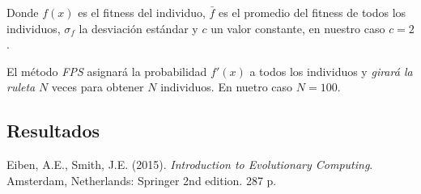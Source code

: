 \documentclass[10pt,letterpaper]{article}
\begin{document}
Donde $f(x)$ es el fitness del individuo, $\bar{f}$ es el promedio del fitness
de todos los individuos, $\sigma_f$ la desviación estándar y $c$ un valor constante,
en nuestro caso $c=2$.

El método \textit{FPS} asignará la probabilidad $f'(x)$ a todos los individuos
y \textit{girará la ruleta} $N$ veces para obtener $N$ individuos. En nuetro caso
$N=100$.
\subsection{Resultados}


\clearpage
\begin{thebibliography}{9}

      Eiben, A.E., Smith, J.E. (2015).
      \textit{Introduction to Evolutionary Computing}.
      Amsterdam, Netherlands: Springer 
      2nd edition. 287 p.
\end{thebibliography}
\end{document}
